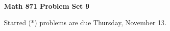 \documentclass[12pt]{article}
\begin{document}
\def\ctln{\centerline}
\def\msk{\medskip}
\def\bsk{\bigskip}
\def\ssk{\smallskip}
\def\ra{\rightarrow}
\def\ubr{\underbar}
\def\sset{\subseteq}
\def\smin{\setminus}

\def\mt{{\mathcal T}}
\def\mb{{\mathcal B}}
\def\ms{{\mathcal S}}
\def\mu{{\mathcal U}}
\def\mv{{\mathcal V}}
\def\mc{{\mathcal C}}

\def\mtp{{\mathcal T}^\prime}
\def\mbp{{\mathcal B}^\prime}
\def\mcp{{\mathcal C}^\prime}

\def\bbr{{\mathbb R}}
\def\bbz{{\mathbb Z}}
\def\spc{$~$\hskip.15in$~$}






\ctln{\bf Math 871 Problem Set 9}

\msk

Starred (*) problems are due Thursday, November 13.
\end{document}
